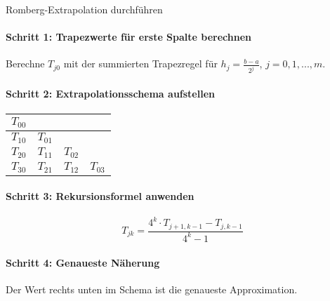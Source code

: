 \begin{KR}{Romberg-Extrapolation durchführen}\\
\paragraph{Schritt 1: Trapezwerte für erste Spalte berechnen}
Berechne $T_{j0}$ mit der summierten Trapezregel für $h_j = \frac{b-a}{2^j}$, $j = 0, 1, ..., m$.

\paragraph{Schritt 2: Extrapolationsschema aufstellen}
\begin{center}
\begin{tabular}{|c|c|c|c|}
\hline
$T_{00}$ & & & \\
\hline
$T_{10}$ & $T_{01}$ & & \\
\hline
$T_{20}$ & $T_{11}$ & $T_{02}$ & \\
\hline
$T_{30}$ & $T_{21}$ & $T_{12}$ & $T_{03}$ \\
\hline
\end{tabular}
\end{center}

\paragraph{Schritt 3: Rekursionsformel anwenden}
$$T_{jk} = \frac{4^k \cdot T_{j+1,k-1} - T_{j,k-1}}{4^k - 1}$$

\paragraph{Schritt 4: Genaueste Näherung}
Der Wert rechts unten im Schema ist die genaueste Approximation.
\end{KR}

